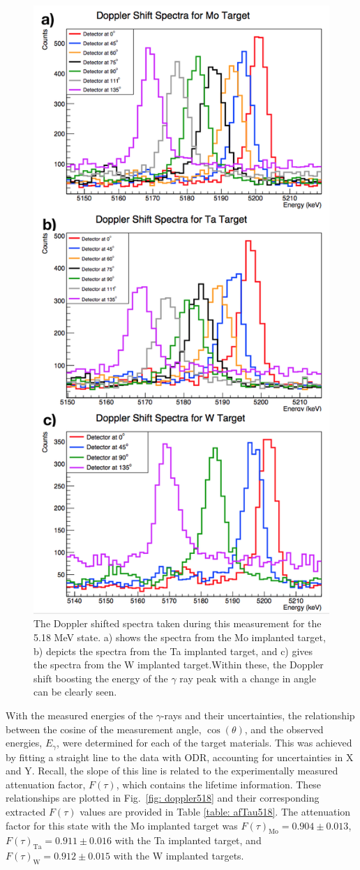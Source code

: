 \begin{figure}
\centering
\includegraphics[width=0.6\linewidth]{figures/shifts518.png}
\caption{The Doppler shifted spectra taken during this measurement for the 5.18 MeV state. a) shows the spectra from the Mo implanted target, b) depicts the spectra from the Ta implanted target, and c) gives the spectra from the W implanted target.Within these, the Doppler shift boosting the energy of the $\gamma$ ray peak  with a change in angle can be clearly seen. }
\label{fig: shift518}
\end{figure}


With the measured energies of the $\gamma$-rays and their uncertainties, the relationship between the cosine of the measurement angle, $\cos(\theta)$, and the observed energies, $E_{\gamma}$, were determined for each of the target materials. This was achieved by fitting a straight line to the data with ODR, accounting for uncertainties in X and Y. Recall, the slope of this line is related to the experimentally measured attenuation factor, $F(\tau)$, which contains the lifetime information. These relationships are plotted in Fig.\ \ref{fig: doppler518} and their corresponding extracted $F(\tau)$ values are provided in Table \ref{table: afTau518}. The attenuation factor for this state with the Mo implanted target was $F(\tau)_{\text{Mo}} = 0.904 \pm 0.013$, $F(\tau)_{\text{Ta}} = 0.911 \pm 0.016$ with the Ta implanted target, and $F(\tau)_{\text{W}} = 0.912 \pm 0.015$ with the W implanted targets.


